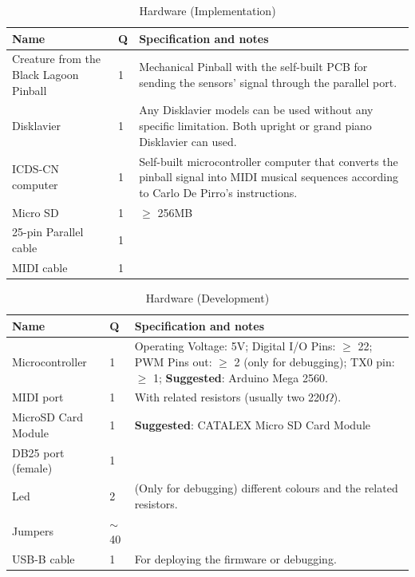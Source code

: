 \begin{longtable}{|p{}|p{}|p{}|}
    \caption{Hardware (Implementation)} \label{tab:a-data-hardware} \\
    \hline
    \textbf{Name} & \textbf{Q} & \textbf{Specification and notes} \\
    \hline
    Creature from the Black Lagoon Pinball & 1 & \scriptsize Mechanical Pinball with the self-built PCB for sending the sensors’ signal through the parallel port.\\
    \hline
    Disklavier & 1 & \scriptsize Any Disklavier models can be used without any specific limitation. Both upright or grand piano Disklavier can used.  \\
    \hline
    ICDS-CN computer & 1 & \scriptsize Self-built microcontroller computer that converts the pinball signal into MIDI musical sequences according to Carlo De Pirro’s instructions. \\
    \hline
    Micro SD & 1 & \scriptsize $\geq$ 256MB \\
    \hline
    25-pin Parallel cable  & 1 & \scriptsize \\
    \hline
    MIDI cable & 1 & \scriptsize \\
    \hline
\end{longtable}

\begin{longtable}{|p{}|p{}|p{}|}
    \caption{Hardware (Development)} \label{tab:a-data-hardware} \\
    \hline
    \textbf{Name} & \textbf{Q} & \textbf{Specification and notes} \\
    \hline
    Microcontroller & 1 & \scriptsize Operating Voltage: 5V; Digital I/O Pins: $\geq$ 22; PWM Pins out: $\geq$ 2 (only for debugging); TX0 pin: $\geq$ 1; \textbf{Suggested}: Arduino Mega 2560.\\
    \hline
    MIDI port & 1 & \scriptsize With related resistors (usually two 220$\Omega$).\\
    \hline
    MicroSD Card Module & 1 & \scriptsize \textbf{Suggested}: CATALEX Micro SD Card Module\\
    \hline
    DB25 port (female) & 1 & \scriptsize \\
    \hline
    Led  & 2 & \scriptsize (Only for debugging) different colours and the related resistors.  \\
    \hline
    Jumpers & $\sim$40 & \scriptsize \\
    \hline
    USB-B cable & 1 & \scriptsize For deploying the firmware or debugging. \\
    \hline
\end{longtable}

